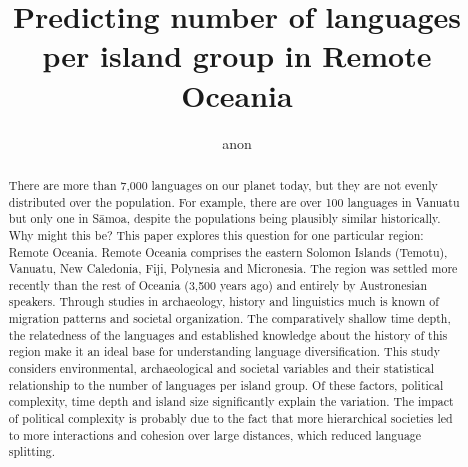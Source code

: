 \documentclass[a4paper,10pt]{article} %
\title{Predicting number of languages per island group in Remote Oceania}
\author{anon}
\begin{document}
\def\code#1{\texttt{#1}}

\thispagestyle{empty}

\maketitle
\thispagestyle{empty}



\begin{abstract}
\doublespacing
\normalsize

There are more than 7,000 languages on our planet today, but they are not evenly distributed over the population. For example, there are over 100 languages in Vanuatu but only one in S\={a}moa, despite the populations being plausibly similar historically. Why might this be? This paper explores this question for one particular region: Remote Oceania.
Remote Oceania comprises the eastern Solomon Islands (Temotu), Vanuatu, New Caledonia, Fiji, Polynesia and Micronesia. The region was settled more recently than the rest of Oceania (3,500 years ago) and entirely by Austronesian speakers. Through studies in archaeology, history and linguistics much is known of migration patterns and societal organization. The comparatively shallow time depth, the relatedness of the languages and established knowledge about the history of this region make it an ideal base for understanding language diversification. This study considers environmental, archaeological and societal variables and their statistical relationship to the number of languages per island group. Of these factors, political complexity, time depth and island size significantly explain the variation. The impact of political complexity is probably due to the fact that more hierarchical societies led to more interactions and cohesion over large distances, which reduced language splitting.



\end{abstract}

\newpage



\newpage
\singlespacing
\tableofcontents

\newpage
\listoffigures
 \listoftables
 \vspace{0.7cm}


\newpage
{}
\end{document}
